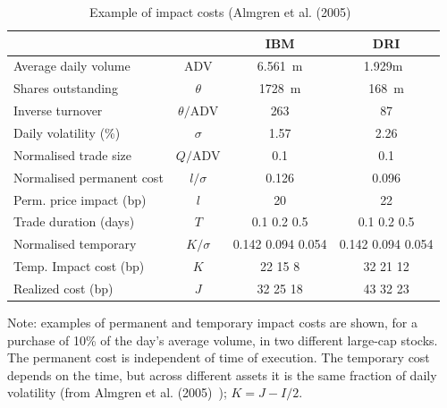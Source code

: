         \begin{table}[!ht]
        \caption{Example of impact costs (Almgren et al. (2005)~\cite{athl}\label{tab:costimpact}}
        \begin{tabular}{lccc}
         & & IBM & DRI \\ \hline
        Average daily volume & ADV & 6.561~m & 1.929m~ \\
        Shares outstanding & $\theta$ & 1728~m & 168~m \\
        Inverse turnover & $\theta/\text{ADV}$ & 263 & 87 \\
        Daily volatility (\%) & $\sigma$ &1.57 & 2.26 \\
        Normalised trade size & $Q/\text{ADV}$ & 0.1 & 0.1 \\ \hline
        Normalised permanent cost & $l/\sigma$ & 0.126 & 0.096 \\
        Perm. price impact (bp) & $l$ & 20 & 22 \\ \hline
        Trade duration (days) & $T$ & 0.1 \hspace{0.2cm} 0.2 \hspace{0.2cm} 0.5 & 0.1 \hspace{0.2cm}0.2 \hspace{0.2cm} 0.5 \\
        Normalised temporary & $K/\sigma$ & 0.142 \hspace{0.2cm} 0.094 \hspace{0.2cm}0.054 & 0.142 \hspace{0.2cm} 0.094 \hspace{0.2cm} 0.054 \\
        Temp. Impact cost (bp) & $K$ & 22 \hspace{0.2cm} 15 \hspace{0.2cm} 8 & 32  \hspace{0.2cm}21\hspace{0.2cm} 12 \\ \hline
        Realized cost (bp) & $J$ & 32 \hspace{0.2cm} 25 \hspace{0.2cm} 18 & 43 \hspace{0.2cm}32 \hspace{0.2cm} 23
        \end{tabular}
        {\small Note: examples of permanent and temporary impact costs are shown, for a purchase of 10\% of the day's average volume, in two different large-cap stocks. The permanent cost is independent of time of execution. The temporary cost depends on the time, but across different assets it is the same fraction of daily volatility (from Almgren et al. (2005)~\cite{athl}); $K= J-I/2$.}
        \end{table}


